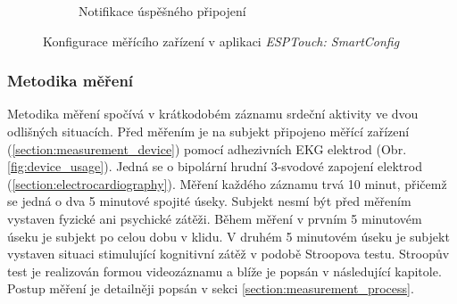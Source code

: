 \begin{figure}[h]
\begin{subfigure}[b]{0.45\textwidth}
        \textcolor{cyan}{\fboxrule=2pt\fboxsep=0pt}
        \caption{Notifikace úspěšného připojení}
        \label{fig:app_screen2}
    \end{subfigure}
    \caption{Konfigurace měřícího zařízení v aplikaci \textit{ESPTouch:
            SmartConfig}}
    \label{fig:esptouch_app}
\end{figure}

\subsubsection{Metodika měření}
\label{section:measurement_methodology}
Metodika měření spočívá v krátkodobém záznamu srdeční aktivity ve dvou odlišných
situacích. Před měřením je na subjekt připojeno měřící zařízení
(\ref{section:measurement_device}) pomocí adhezivních EKG elektrod (Obr.
\ref{fig:device_usage}). Jedná se o bipolární hrudní 3-svodové zapojení elektrod
(\ref{section:electrocardiography}). Měření každého záznamu trvá 10 minut,
přičemž se jedná o dva 5 minutové spojité úseky. Subjekt nesmí být před měřením
vystaven fyzické ani psychické zátěži. Během měření v prvním 5 minutovém úseku
je subjekt po celou dobu v klidu. V druhém 5 minutovém úseku je subjekt vystaven
situaci stimulující kognitivní zátěž v podobě Stroopova testu. Stroopův test je
realizován formou videozáznamu a blíže je popsán v následující kapitole. Postup
měření je detailněji popsán v sekci \ref{section:measurement_process}.

